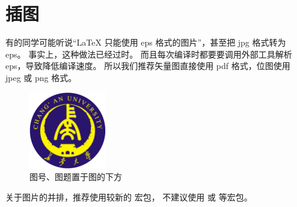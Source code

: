 \section{插图}

有的同学可能听说“\LaTeX{} 只能使用 eps 格式的图片”，甚至把 jpg 格式转为 eps。
事实上，这种做法已经过时。
而且每次编译时都要要调用外部工具解析 eps，导致降低编译速度。
所以我们推荐矢量图直接使用 pdf 格式，位图使用 jpeg 或 png 格式。
\begin{figure}[htb]
  \centering
  \includegraphics[width=0.3\textwidth]{figures/chdcolorlogo.eps}
  \caption{图号、图题置于图的下方}
  \label{fig:logo}
\end{figure}

关于图片的并排，推荐使用较新的  宏包，
不建议使用  或  等宏包。
